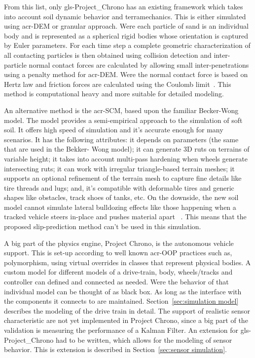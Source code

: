 From this list, only \gls{gls-Project_Chrono} has an existing framework which takes into account soil dynamic
behavior and
terramechanics. This is either simulated using \gls{acr-DEM} or granular approach. Were each particle of sand is
an individual body and is represented as a spherical rigid bodies whose orientation is captured by Euler parameters.
For each time step a complete geometric characterization of all contacting particles is then obtained using collision
detection and inter- particle normal contact forces are calculated by allowing small inter-penetrations using a penalty
method for \gls{acr-DEM}. Were the normal contact force is based on Hertz law and friction forces are calculated using
the Coulomb limit~\cite{recuero_high-fidelity_2017}\cite{serban_co-simulation_2018}. This method is computational heavy
and more suitable for detailed modeling.

An alternative method is the \gls{acr-SCM}, based upon the familiar Becker-Wong model. The model provides a
semi-empirical approach to the simulation of soft soil. It offers high speed of simulation and it's accurate enough for
many scenarios. It has the following attributes: it depends on parameters (the same that are used in the Bekker- Wong
model); it can generate 3D ruts on terrains of variable height; it takes into account multi-pass hardening when wheels
generate intersecting ruts; it can work with irregular triangle-based terrain meshes; it supports an optional refinement
of the terrain mesh to capture fine details like tire threads and lugs; and, it's compatible with deformable tires and
generic shapes like obstacles, track shoes of tanks, etc. On the downside, the new soil model cannot simulate lateral
bulldozing effects like those happening when a tracked vehicle steers in-place and pushes material apart~
\cite{tasora_overview_2018}. This means that the proposed slip-prediction method can't be used in this simulation.

A big part of the physics engine, Project Chrono, is the autonomous vehicle support. This is set-up according to well
known \gls{acr-OOP} practices such as, polymorphism, using virtual overrides in classes that represent physical
bodies. A custom model for different models of a drive-train, body, wheels/tracks and controller can defined and
connected as needed. Were the behavior of that individual model can be thought of as black box. As long as the interface
with the components it connects to are maintained. Section~\ref{sec:simulation model} describes the modeling of the
drive train in detail. The support of realistic sensor characteristic are not yet implemented in Project Chrono, since a
big part of the validation is measuring the performance of a Kalman Filter. An extension for \gls{gls-Project_Chrono}
had to be
written, which allows for the modeling of sensor behavior. This is extension is described in Section~\ref{sec:sensor
simulation}.

